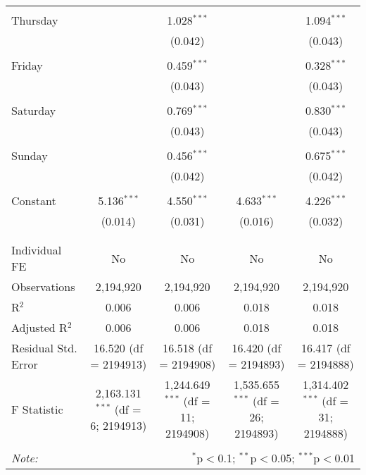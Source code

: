 \documentclass[
]{article}
\begin{document}
\begin{table}[!htbp]
{\begin{tabular}{@{\extracolsep{5pt}}lcccc}
  & & & & \\ 
 Thursday &  & 1.028$^{***}$ &  & 1.094$^{***}$ \\ 
  &  & (0.042) &  & (0.043) \\ 
  & & & & \\ 
 Friday &  & 0.459$^{***}$ &  & 0.328$^{***}$ \\ 
  &  & (0.043) &  & (0.043) \\ 
  & & & & \\ 
 Saturday &  & 0.769$^{***}$ &  & 0.830$^{***}$ \\ 
  &  & (0.043) &  & (0.043) \\ 
  & & & & \\ 
 Sunday &  & 0.456$^{***}$ &  & 0.675$^{***}$ \\ 
  &  & (0.042) &  & (0.042) \\ 
  & & & & \\ 
 Constant & 5.136$^{***}$ & 4.550$^{***}$ & 4.633$^{***}$ & 4.226$^{***}$ \\ 
  & (0.014) & (0.031) & (0.016) & (0.032) \\ 
  & & & & \\ 
\hline \\[-1.8ex] 
Individual FE & No & No & No & No \\ 
Observations & 2,194,920 & 2,194,920 & 2,194,920 & 2,194,920 \\ 
R$^{2}$ & 0.006 & 0.006 & 0.018 & 0.018 \\ 
Adjusted R$^{2}$ & 0.006 & 0.006 & 0.018 & 0.018 \\ 
Residual Std. Error & 16.520 (df = 2194913) & 16.518 (df = 2194908) & 16.420 (df = 2194893) & 16.417 (df = 2194888) \\ 
F Statistic & 2,163.131$^{***}$ (df = 6; 2194913) & 1,244.649$^{***}$ (df = 11; 2194908) & 1,535.655$^{***}$ (df = 26; 2194893) & 1,314.402$^{***}$ (df = 31; 2194888) \\ 
\hline 
\hline \\[-1.8ex] 
\textit{Note:}  & \multicolumn{4}{r}{$^{*}$p$<$0.1; $^{**}$p$<$0.05; $^{***}$p$<$0.01} \\ 
\end{tabular}
} 
\end{table} 
\newpage
\end{document}
